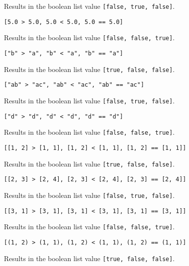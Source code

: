 {\begin{itemize}
{			Results in the boolean list value \lstinline[language=MAIA, columns=fixed]@[false, true, false]@.
			
		\item[] \lstinline[language=MAIA, columns=fixed]@[5.0 > 5.0, 5.0 < 5.0, 5.0 == 5.0]@
		
			Results in the boolean list value \lstinline[language=MAIA, columns=fixed]@[false, false, true]@.
			
		\item[] \lstinline[language=MAIA, columns=fixed]@["b" > "a", "b" < "a", "b" == "a"]@
		
			Results in the boolean list value \lstinline[language=MAIA, columns=fixed]@[true, false, false]@.
			
		\item[] \lstinline[language=MAIA, columns=fixed]@["ab" > "ac", "ab" < "ac", "ab" == "ac"]@
		
			Results in the boolean list value \lstinline[language=MAIA, columns=fixed]@[false, true, false]@.
			
		\item[] \lstinline[language=MAIA, columns=fixed]@["d" > "d", "d" < "d", "d" == "d"]@
		
			Results in the boolean list value \lstinline[language=MAIA, columns=fixed]@[false, false, true]@.
			
		\item[] \lstinline[language=MAIA, columns=fixed]@[[1, 2] > [1, 1], [1, 2] < [1, 1], [1, 2] == [1, 1]]@
		
			Results in the boolean list value \lstinline[language=MAIA, columns=fixed]@[true, false, false]@.
			
		\item[] \lstinline[language=MAIA, columns=fixed]@[[2, 3] > [2, 4], [2, 3] < [2, 4], [2, 3] == [2, 4]]@
		
			Results in the boolean list value \lstinline[language=MAIA, columns=fixed]@[false, true, false]@.
			
		\item[] \lstinline[language=MAIA, columns=fixed]@[[3, 1] > [3, 1], [3, 1] < [3, 1], [3, 1] == [3, 1]]@
		
			Results in the boolean list value \lstinline[language=MAIA, columns=fixed]@[false, false, true]@.
			
		\item[] \lstinline[language=MAIA, columns=fixed]@[(1, 2) > (1, 1), (1, 2) < (1, 1), (1, 2) == (1, 1)]@
		
			Results in the boolean list value \lstinline[language=MAIA, columns=fixed]@[true, false, false]@.
			
}
\end{itemize}}
